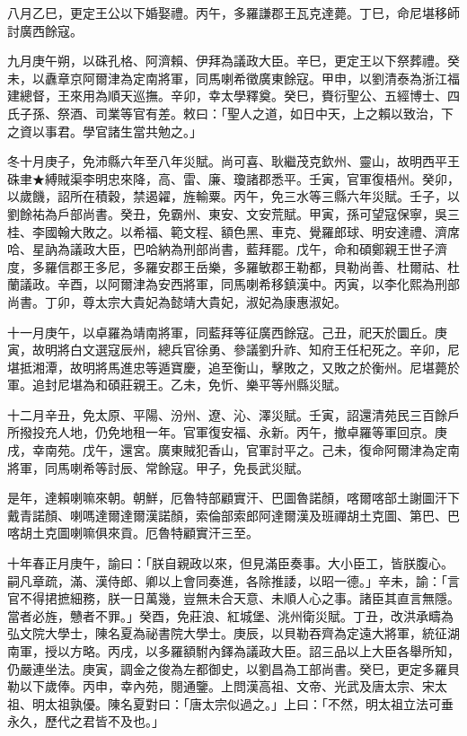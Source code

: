 \begin{pinyinscope}
八月乙巳，更定王公以下婚娶禮。丙午，多羅謙郡王瓦克達薨。丁巳，命尼堪移師討廣西餘寇。

九月庚午朔，以硃孔格、阿濟賴、伊拜為議政大臣。辛巳，更定王以下祭葬禮。癸未，以纛章京阿爾津為定南將軍，同馬喇希徵廣東餘寇。甲申，以劉清泰為浙江福建總督，王來用為順天巡撫。辛卯，幸太學釋奠。癸巳，賚衍聖公、五經博士、四氏子孫、祭酒、司業等官有差。敕曰：「聖人之道，如日中天，上之賴以致治，下之資以事君。學官諸生當共勉之。」

冬十月庚子，免沛縣六年至八年災賦。尚可喜、耿繼茂克欽州、靈山，故明西平王硃聿★縛賊渠李明忠來降，高、雷、廉、瓊諸郡悉平。壬寅，官軍復梧州。癸卯，以歲饑，詔所在積穀，禁遏糴，旌輸粟。丙午，免三水等三縣六年災賦。壬子，以劉餘祐為戶部尚書。癸丑，免霸州、東安、文安荒賦。甲寅，孫可望寇保寧，吳三桂、李國翰大敗之。以希福、範文程、額色黑、車克、覺羅郎球、明安達禮、濟席哈、星訥為議政大臣，巴哈納為刑部尚書，藍拜罷。戊午，命和碩鄭親王世子濟度，多羅信郡王多尼，多羅安郡王岳樂，多羅敏郡王勒都，貝勒尚善、杜爾祜、杜蘭議政。辛酉，以阿爾津為安西將軍，同馬喇希移鎮漢中。丙寅，以李化熙為刑部尚書。丁卯，尊太宗大貴妃為懿靖大貴妃，淑妃為康惠淑妃。

十一月庚午，以卓羅為靖南將軍，同藍拜等征廣西餘寇。己丑，祀天於圜丘。庚寅，故明將白文選寇辰州，總兵官徐勇、參議劉升祚、知府王任杞死之。辛卯，尼堪抵湘潭，故明將馬進忠等遁寶慶，追至衡山，擊敗之，又敗之於衡州。尼堪薨於軍。追封尼堪為和碩莊親王。乙未，免忻、樂平等州縣災賦。

十二月辛丑，免太原、平陽、汾州、遼、沁、澤災賦。壬寅，詔還清苑民三百餘戶所撥投充人地，仍免地租一年。官軍復安福、永新。丙午，撤卓羅等軍回京。庚戌，幸南苑。戊午，還宮。廣東賊犯香山，官軍討平之。己未，復命阿爾津為定南將軍，同馬喇希等討辰、常餘寇。甲子，免長武災賦。

是年，達賴喇嘛來朝。朝鮮，厄魯特部顧實汗、巴圖魯諾顏，喀爾喀部土謝圖汗下戴青諾顏、喇嗎達爾達爾漢諾顏，索倫部索郎阿達爾漢及班禪胡土克圖、第巴、巴喀胡土克圖喇嘛俱來貢。厄魯特顧實汗三至。

十年春正月庚午，諭曰：「朕自親政以來，但見滿臣奏事。大小臣工，皆朕腹心。嗣凡章疏，滿、漢侍郎、卿以上會同奏進，各除推諉，以昭一德。」辛未，諭：「言官不得捃摭細務，朕一日萬幾，豈無未合天意、未順人心之事。諸臣其直言無隱。當者必旌，戇者不罪。」癸酉，免莊浪、紅城堡、洮州衛災賦。丁丑，改洪承疇為弘文院大學士，陳名夏為祕書院大學士。庚辰，以貝勒吞齊為定遠大將軍，統征湖南軍，授以方略。丙戌，以多羅額駙內鐸為議政大臣。詔三品以上大臣各舉所知，仍嚴連坐法。庚寅，調金之俊為左都御史，以劉昌為工部尚書。癸巳，更定多羅貝勒以下歲俸。丙申，幸內苑，閱通鑒。上問漢高祖、文帝、光武及唐太宗、宋太祖、明太祖孰優。陳名夏對曰：「唐太宗似過之。」上曰：「不然，明太祖立法可垂永久，歷代之君皆不及也。」


\end{pinyinscope}
